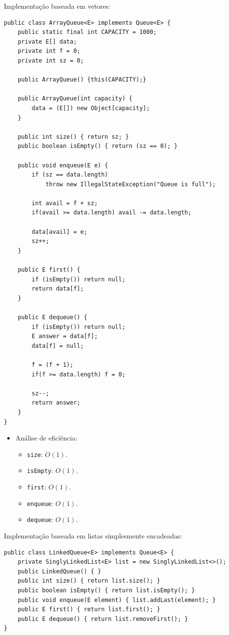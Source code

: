 Implementação baseada em vetores:
\begin{verbatim}
public class ArrayQueue<E> implements Queue<E> {
	public static final int CAPACITY = 1000;
	private E[] data;
	private int f = 0;
	private int sz = 0;
	
	public ArrayQueue() {this(CAPACITY);}
	
	public ArrayQueue(int capacity) {
		data = (E[]) new Object[capacity];
	}
	
	public int size() { return sz; }
	public boolean isEmpty() { return (sz == 0); }
	
	public void enqueue(E e) {
		if (sz == data.length) 
			throw new IllegalStateException("Queue is full");
		
		int avail = f + sz;
		if(avail >= data.length) avail -= data.length;
		
		data[avail] = e;
		sz++;
	}
	
	public E first() {
		if (isEmpty()) return null;
		return data[f];
	}
	
	public E dequeue() {
		if (isEmpty()) return null;
		E answer = data[f];
		data[f] = null;
		
		f = (f + 1);
		if(f >= data.length) f = 0;
		
		sz--;
		return answer;
	}
}
\end{verbatim}

\medskip

\begin{itemize}
	\item Análise de eficiência:
	\begin{itemize}
		\item \texttt{size}: $O(1)$.
		\item \texttt{isEmpty}: $O(1)$.
		\item \texttt{first}: $O(1)$.
		\item \texttt{enqueue}: $O(1)$.
		\item \texttt{dequeue}: $O(1)$.
	\end{itemize}
\end{itemize}

\medskip

Implementação baseada em listas simplesmente encadeadas:
\begin{verbatim}
public class LinkedQueue<E> implements Queue<E> {
	private SinglyLinkedList<E> list = new SinglyLinkedList<>();
	public LinkedQueue() { }
	public int size() { return list.size(); }
	public boolean isEmpty() { return list.isEmpty(); }
	public void enqueue(E element) { list.addLast(element); }
	public E first() { return list.first(); }
	public E dequeue() { return list.removeFirst(); }
}
\end{verbatim}

